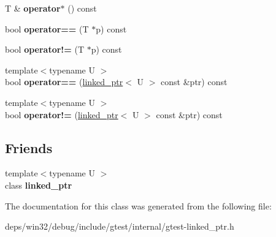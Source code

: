 \begin{DoxyCompactItemize}
\item 
\hypertarget{classtesting_1_1internal_1_1linked__ptr_aec393cbd60f96defde36ef8a69d94254}{}T \& {\bfseries operator$\ast$} () const \label{classtesting_1_1internal_1_1linked__ptr_aec393cbd60f96defde36ef8a69d94254}

\item 
\hypertarget{classtesting_1_1internal_1_1linked__ptr_abe2154fd3ad3574dfe6f2320bc1debc4}{}bool {\bfseries operator==} (T $\ast$p) const \label{classtesting_1_1internal_1_1linked__ptr_abe2154fd3ad3574dfe6f2320bc1debc4}

\item 
\hypertarget{classtesting_1_1internal_1_1linked__ptr_a3685f9661bbe410cfa58fea2f14396b7}{}bool {\bfseries operator!=} (T $\ast$p) const \label{classtesting_1_1internal_1_1linked__ptr_a3685f9661bbe410cfa58fea2f14396b7}

\item 
\hypertarget{classtesting_1_1internal_1_1linked__ptr_a3b46c9ecfd928673a524dcb3c70fd2ad}{}{\footnotesize template$<$typename U $>$ }\\bool {\bfseries operator==} (\hyperlink{classtesting_1_1internal_1_1linked__ptr}{linked\+\_\+ptr}$<$ U $>$ const \&ptr) const \label{classtesting_1_1internal_1_1linked__ptr_a3b46c9ecfd928673a524dcb3c70fd2ad}

\item 
\hypertarget{classtesting_1_1internal_1_1linked__ptr_a6449584b90a09a313300599fb3a23633}{}{\footnotesize template$<$typename U $>$ }\\bool {\bfseries operator!=} (\hyperlink{classtesting_1_1internal_1_1linked__ptr}{linked\+\_\+ptr}$<$ U $>$ const \&ptr) const \label{classtesting_1_1internal_1_1linked__ptr_a6449584b90a09a313300599fb3a23633}

\end{DoxyCompactItemize}
\subsection*{Friends}
\begin{DoxyCompactItemize}
\item 
\hypertarget{classtesting_1_1internal_1_1linked__ptr_a7763f286ca03a7f7363a033d996c8c1c}{}{\footnotesize template$<$typename U $>$ }\\class {\bfseries linked\+\_\+ptr}\label{classtesting_1_1internal_1_1linked__ptr_a7763f286ca03a7f7363a033d996c8c1c}

\end{DoxyCompactItemize}


The documentation for this class was generated from the following file\+:\begin{DoxyCompactItemize}
\item 
deps/win32/debug/include/gtest/internal/gtest-\/linked\+\_\+ptr.\+h\end{DoxyCompactItemize}
